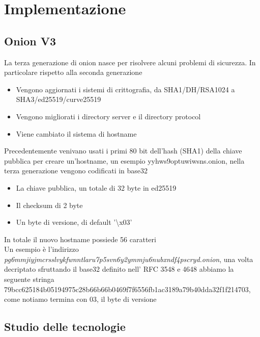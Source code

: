 \chapter{Implementazione}

\section{Onion V3}

La terza generazione di onion nasce per risolvere alcuni problemi di sicurezza. In particolare rispetto alla seconda generazione
\begin{itemize}
    \item Vengono aggiornati i sistemi di crittografia, da SHA1/DH/RSA1024 a SHA3/ed25519/curve25519
    \item Vengono migliorati i directory server e il directory protocol
    \item Viene cambiato il sistema di hostname
\end{itemize}
Precedentemente venivano usati i primi 80 bit dell'hash (SHA1) della chiave pubblica per creare un'hostname, un esempio yyhws9optuwiwsns.onion, nella terza generazione vengono codificati in base32
\begin{itemize}
    \item La chiave pubblica, un totale di 32 byte in ed25519
    \item Il checksum di 2 byte
    \item Un byte di versione, di default '\textbackslash x03' 
\end{itemize}
In totale il nuovo hostname possiede 56 caratteri \cite{Torv3} \\
Un esempio è l'indirizzo \emph{pg6mmjiyjmcrsslvykfwnntlaru7p5svn6y2ymmju6nubxndf4pscryd.onion}, una volta decriptato sfruttando il base32 definito nell' RFC 3548 e 4648 abbiamo la seguente stringa 79bcc625184b05194975c28b66b66b0469f7f6556fb1ac3189a79b40dda32f1f214703, come notiamo termina con 03, il byte di versione

\section{Studio delle tecnologie}

